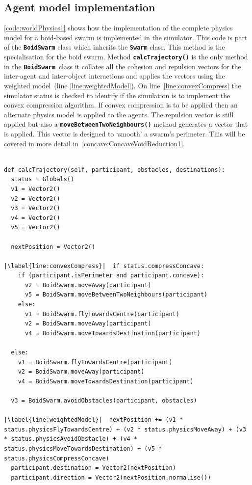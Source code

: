 \subsection{Agent model implementation}
\autoref{code:worldPhysics1} shows how the implementation of the complete physics model for a boid-based swarm is implemented in the simulator. This code is part of the \texttt{\textbf{BoidSwarm}} class which inherits the \texttt{\textbf{Swarm}} class. This method is the specialisation for the boid swarm. Method \texttt{\textbf{calcTrajectory()}} is the only method in the \texttt{\textbf{BoidSwarm}}~class it collates all the cohesion and repulsion vectors for the inter-agent and inter-object interactions and applies the vectors using the weighted model~(line \autoref{line:weightedModel}). On line~\autoref{line:convexCompress} the simulator status is checked to identify if the simulation is to implement the convex compression algorithm. If convex compression is to be applied then an alternate physics model is applied to the agents. The repulsion vector is still applied but also a \texttt{\textbf{moveBetweenTwoNeighbours()}} method generates a vector that is applied. This vector is designed to `smooth' a swarm's perimeter. This will be covered in more detail in~\autoref{concave:ConcaveVoidReduction1}.

\lstset{language=Python,
basicstyle=\tiny,
numbers=left, 
numberstyle=\tiny,
captionpos=b,
frame=single,
breaklines=true,
caption=Agent trajectory code,
escapechar=|
} %
\begin{lstlisting}[label={code:worldPhysics1}]  % Start your code-block

def calcTrajectory(self, participant, obstacles, destinations):
  status = Globals()
  v1 = Vector2()
  v2 = Vector2()
  v3 = Vector2()
  v4 = Vector2()
  v5 = Vector2()

  nextPosition = Vector2()
        
|\label{line:convexCompress}|  if status.compressConcave:
    if (participant.isPerimeter and participant.concave):
      v2 = BoidSwarm.moveAway(participant)
      v5 = BoidSwarm.moveBetweenTwoNeighbours(participant)
    else:
      v1 = BoidSwarm.flyTowardsCentre(participant)
      v2 = BoidSwarm.moveAway(participant)
      v4 = BoidSwarm.moveTowardsDestination(participant)

  else:
    v1 = BoidSwarm.flyTowardsCentre(participant)            
    v2 = BoidSwarm.moveAway(participant)
    v4 = BoidSwarm.moveTowardsDestination(participant)

  v3 = BoidSwarm.avoidObstacles(participant, obstacles)

|\label{line:weightedModel}|  nextPosition += (v1 * status.physicsFlyTowardsCentre) + (v2 * status.physicsMoveAway) + (v3 * status.physicsAvoidObstacle) + (v4 * status.physicsMoveTowardsDestination) + (v5 * status.physicsCompressConcave)
  participant.destination = Vector2(nextPosition)
  participant.direction = Vector2(nextPosition.normalise())
\end{lstlisting}

